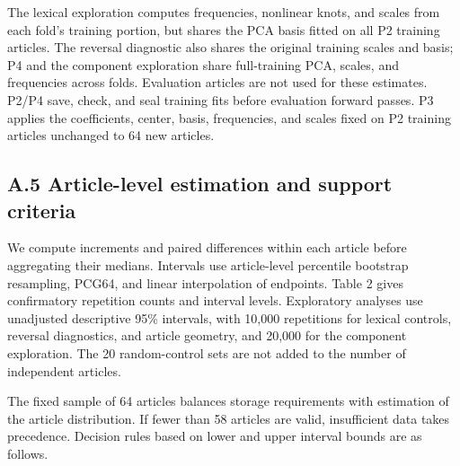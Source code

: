 The lexical exploration computes frequencies, nonlinear knots, and scales from each fold's training portion, but shares the PCA basis fitted on all P2 training articles. The reversal diagnostic also shares the original training scales and basis; P4 and the component exploration share full-training PCA, scales, and frequencies across folds. Evaluation articles are not used for these estimates. P2/P4 save, check, and seal training fits before evaluation forward passes. P3 applies the coefficients, center, basis, frequencies, and scales fixed on P2 training articles unchanged to 64 new articles.

\FloatBarrier

\subsection{A.5 Article-level estimation and support criteria}\label{a.5-article-level-estimation-and-support-criteria}

We compute increments and paired differences within each article before aggregating their medians. Intervals use article-level percentile bootstrap resampling, PCG64, and linear interpolation of endpoints. Table 2 gives confirmatory repetition counts and interval levels. Exploratory analyses use unadjusted descriptive 95\% intervals, with 10,000 repetitions for lexical controls, reversal diagnostics, and article geometry, and 20,000 for the component exploration. The 20 random-control sets are not added to the number of independent articles.

The fixed sample of 64 articles balances storage requirements with estimation of the article distribution. If fewer than 58 articles are valid, insufficient data takes precedence. Decision rules based on lower and upper interval bounds are as follows.

